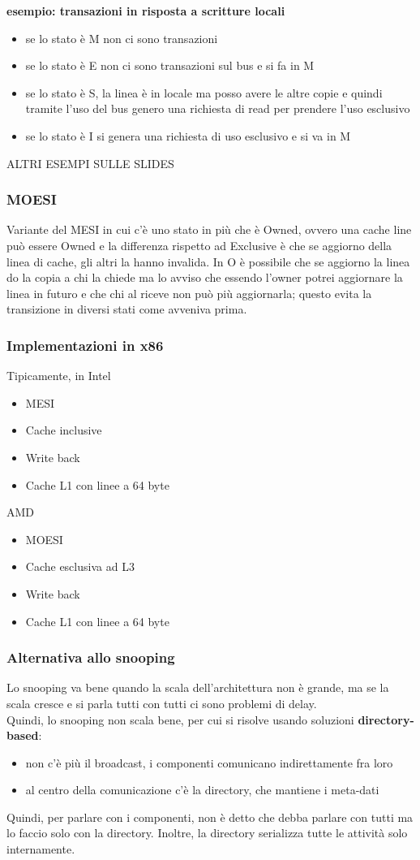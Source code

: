 \documentclass[14pt, oneside]{book}
\begin{document}
\textbf{esempio: transazioni in risposta a scritture locali}\\
\begin{itemize}
\item se lo stato è M non ci sono transazioni
\item se lo stato è E non ci sono transazioni sul bus e si fa in M
\item se lo stato è S, la linea è in locale ma posso avere le altre copie e quindi tramite l'uso del bus genero una richiesta di read per prendere l'uso esclusivo
\item se lo stato è I si genera una richiesta di uso esclusivo e si va in M
\end{itemize}
ALTRI ESEMPI SULLE SLIDES
\subsubsection{MOESI}
Variante del MESI in cui c'è uno stato in più che è Owned, ovvero una cache line può essere Owned e la differenza rispetto ad Exclusive è che se aggiorno della linea di cache, gli altri la hanno invalida. In O è possibile che se aggiorno la linea do la copia a chi la chiede ma lo avviso che essendo l'owner potrei aggiornare la linea in futuro e che chi al riceve non può più aggiornarla; questo evita la transizione in diversi stati come avveniva prima.
\subsubsection{Implementazioni in x86}
Tipicamente, in Intel
\begin{itemize}
\item MESI
\item Cache inclusive
\item Write back
\item Cache L1 con linee a 64 byte
\end{itemize}
AMD
\begin{itemize}
\item MOESI
\item Cache esclusiva ad L3
\item Write back
\item Cache L1 con linee a 64 byte
\end{itemize}
\subsubsection{Alternativa allo snooping}
Lo snooping va bene quando la scala dell'architettura non è grande, ma se la scala cresce e si parla tutti con tutti ci sono problemi di delay.\\ Quindi, lo snooping non scala bene, per cui si risolve usando soluzioni \textbf{directory-based}:
\begin{itemize}
\item non c'è più il broadcast, i componenti comunicano indirettamente fra loro
\item al centro della comunicazione c'è la directory, che mantiene i meta-dati
\end{itemize}
Quindi, per parlare con i componenti, non è detto che debba parlare con tutti ma lo faccio solo con la directory. Inoltre, la directory serializza tutte le attività solo internamente.
\end{document}
